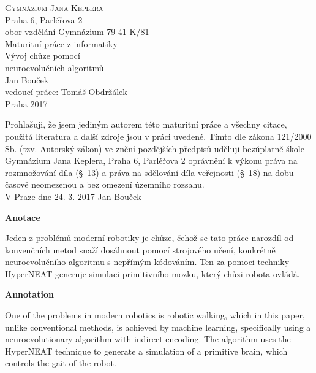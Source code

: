 \documentclass[a4]{article}
\begin{document}
 
 
\begin{titlepage} 
\begin{center} 
{\huge\textsc{Gymnázium Jana Keplera}\\}
{\large{Praha 6, Parléřova 2}}\\
{\large{obor vzdělání Gymnázium 79-41-K/81}\\[5cm]} 
{\Large{Maturitní práce z informatiky}\\[0.2cm]}
{\Huge{Vývoj chůze pomocí\\neuroevolučních algoritmů}}\\\vfill
{\Large{Jan Bouček}\\} 
{\large{vedoucí práce: Tomáš Obdržálek}\\} 
{\large{Praha 2017}} 
\end{center} 
\end{titlepage} 
 
\newpage 
Prohlašuji, že jsem jediným autorem této maturitní práce a všechny citace, použitá literatura a další zdroje jsou v práci uvedené. Tímto dle zákona 121/2000 Sb. (tzv. Autorský zákon) ve znění pozdějších předpisů uděluji bezúplatně škole Gymnázium Jana Keplera, Praha 6, Parléřova 2 oprávnění k výkonu práva na rozmnožování díla (§~13) a práva na sdělování díla veřejnosti (§~18) na dobu časově neomezenou a bez omezení územního rozsahu.\\[0.7cm] 
\vspace{10cm} 
{\large{V Praze dne 24. 3. 2017} \hfill Jan Bouček} 
\newpage 
\tableofcontents
\newpage
{\Large\textbf{Anotace}\par}
Jeden z problémů moderní robotiky je chůze, čehož se tato práce narozdíl od konvenčních metod snaží dosáhnout pomocí strojového učení, konkrétně neuroevolučního algoritmu s nepřímým kódováním. Ten za pomoci techniky HyperNEAT generuje simulaci primitivního mozku, který chůzi robota ovládá.\par 

{\Large\textbf{Annotation}\par}
One of the problems in modern robotics is robotic walking, which in this paper, unlike conventional methods, is achieved by machine learning, specifically using a neuroevolutionary algorithm with indirect encoding. The algorithm uses the HyperNEAT technique to generate a simulation of a primitive brain, which controls the gait of the robot.\par  
\end{document}
